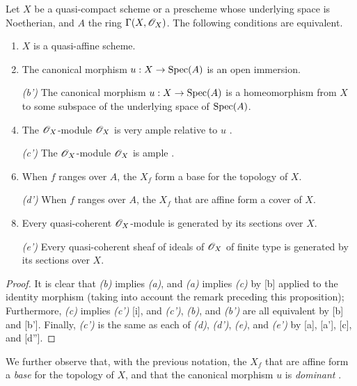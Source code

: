 \begin{prop}[5.1.2]
\label{2.5.1.2}
Let $X$ be a quasi-compact scheme or a prescheme whose underlying space is Noetherian, and $A$ the ring $\Gamma(X,\mathscr{O}_X)$.
The following conditions are equivalent.
\begin{enumerate}[label=\emph{(\alph*)}]
    \item $X$ is a quasi-affine scheme.
    \item The canonical morphism $u:X\to\Spec(A)$ is an open immersion.
    \item[\emph{(b')}] The canonical morphism $u:X\to\Spec(A)$ is a homeomorphism from $X$ to some subspace of the underlying space of ${\mathop{\mathrm{Spec}}\nolimits}(A)$.
    \item The $\mathscr{O}_X$-module $\mathscr{O}_X$ is very ample relative to $u$ .
    \item[\emph{(c')}] The $\mathscr{O}_X$-module $\mathscr{O}_X$ is ample .
    \item When $f$ ranges over $A$, the $X_f$ form a base for the topology of $X$.
    \item[\emph{(d')}] When $f$ ranges over $A$, the $X_f$ that are affine form a cover of $X$.
    \item Every quasi-coherent $\mathscr{O}_X$-module is generated by its sections over $X$.
    \item[\emph{(e')}] Every quasi-coherent sheaf of ideals of $\mathscr{O}_X$ of finite type is generated by its sections over $X$.
\end{enumerate}
\end{prop}

\begin{proof}
\label{proof-2.5.1.2}
It is clear that \emph{(b)} implies \emph{(a)}, and \emph{(a)} implies \emph{(c)} by [b] applied to the identity morphism (taking into account the remark preceding this proposition);
Furthermore, \emph{(c)} implies \emph{(c')} [i], and \emph{(c')}, \emph{(b)}, and \emph{(b')} are all equivalent by [b] and [b'].
Finally, \emph{(c')} is the same as each of \emph{(d)}, \emph{(d')}, \emph{(e)}, and \emph{(e')} by [a], [a'], [c], and [d''].
\end{proof}

We further observe that, with the previous notation, the $X_f$ that are affine form a \emph{base} for the topology of $X$, and that the canonical morphism $u$ is \emph{dominant} .

